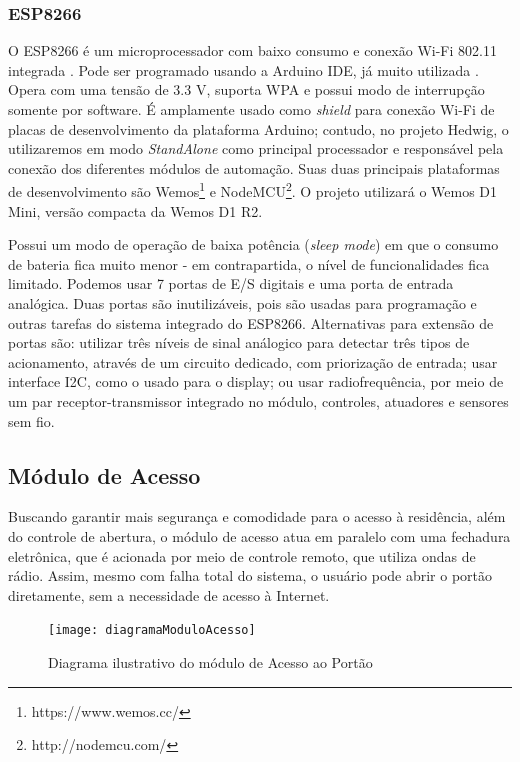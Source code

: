 \subsubsection{ESP8266}
O ESP8266 é um microprocessador com baixo consumo e conexão Wi-Fi 802.11 integrada \cite{espressif}. Pode ser programado usando a Arduino IDE, já muito utilizada \cite{thomsen}. Opera com uma tensão de 3.3 V, suporta WPA e possui modo de interrupção somente por software. É amplamente usado como \textit{shield} para conexão Wi-Fi de placas de desenvolvimento da plataforma Arduino; contudo, no projeto Hedwig, o utilizaremos em modo \textit{StandAlone} como principal processador e responsável pela conexão dos diferentes módulos de automação. Suas duas principais plataformas de desenvolvimento são Wemos\footnote{https://www.wemos.cc/} e NodeMCU\footnote{http://nodemcu.com/}. O projeto utilizará o Wemos D1 Mini, versão compacta da Wemos D1 R2.

Possui um modo de operação de baixa potência (\textit{sleep mode}) em que o consumo de bateria fica muito menor - em contrapartida, o nível de funcionalidades fica limitado. Podemos usar 7 portas de E/S digitais e uma porta de entrada analógica. Duas portas são inutilizáveis, pois são usadas para programação e outras tarefas do sistema integrado do ESP8266. Alternativas para extensão de portas são: utilizar três níveis de sinal análogico para detectar três tipos de acionamento, através de um circuito dedicado, com priorização de entrada; usar interface I2C, como o usado para o display; ou usar radiofrequência, por meio de um par receptor-transmissor integrado no módulo, controles, atuadores e sensores sem fio.

\subsection{Módulo de Acesso}

Buscando garantir mais segurança e comodidade para o acesso à residência, além do controle de abertura, o módulo de acesso atua em paralelo com uma fechadura eletrônica, que é acionada por meio de controle remoto, que utiliza ondas de rádio. Assim, mesmo com falha total do sistema, o usuário pode abrir o portão diretamente, sem a necessidade de acesso à Internet.

\begin{figure}[H]
	\centering
	\caption{Diagrama ilustrativo do módulo de Acesso ao Portão}
  \texttt{[image: diagramaModuloAcesso]}
\label{fig:diagramaModuloAcesso}
\end{figure}

